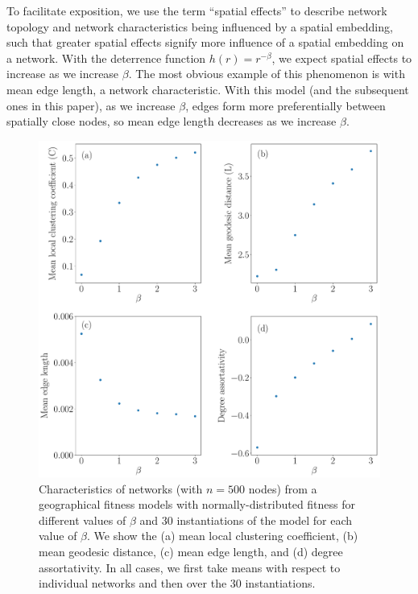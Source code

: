 \documentclass[%
 reprint,
 amsmath,amssymb,
 aps,
]{revtex4-1}
\begin{document}
To facilitate exposition, 
we use the term ``spatial effects'' to describe network topology and network characteristics being influenced by a spatial embedding, such that greater spatial effects signify more influence of a spatial embedding on a network.
With the deterrence function $h(r) = r^{-\beta}$, we expect spatial effects to increase as we increase $\beta$. The most obvious example of this phenomenon is with mean edge length, a network characteristic. With this model (and the subsequent ones in this paper), as we increase $\beta$, edges form more preferentially between spatially close nodes, so mean edge length decreases as we increase $\beta$. 


\begin{figure}
    \centering
    \includegraphics[width=1.0\linewidth]{geographical_network_metrics3.pdf}
    \caption{Characteristics of networks (with $n = 500$ nodes) from a geographical fitness models with normally-distributed fitness for different values of $\beta$ and $30$ instantiations of the model for each value of $\beta$. We show the (a) mean local clustering coefficient, (b) mean geodesic distance, (c) mean edge length, and (d) degree assortativity. In all cases, we first take means with respect to individual networks and then over the $30$ instantiations.
    }
    \label{fig:gf_metrics}
\end{figure}
\end{document}
